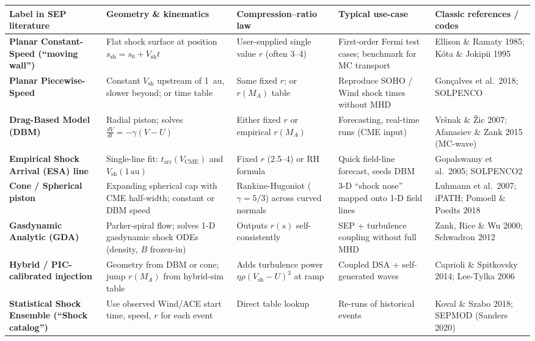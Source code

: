 \begin{longtable}{p{4cm} p{3.5cm} p{3.5cm} p{3.5cm} p{4cm}}
\toprule
\textbf{Label in SEP literature} & \textbf{Geometry \& kinematics} & \textbf{Compression–ratio law} & \textbf{Typical use-case} & \textbf{Classic references / codes} \\
\midrule
\textbf{Planar Constant-Speed (``moving wall'')} & Flat shock surface at position $s_{\mathrm{sh}} = s_0 + V_{\mathrm{sh}} t$ & User-supplied single value $r$ (often 3--4) & First-order Fermi test cases; benchmark for MC transport & Ellison \& Ramaty 1985; Kóta \& Jokipii 1995 \\
\textbf{Planar Piecewise-Speed} & Constant $V_{\mathrm{sh}}$ upstream of 1~au, slower beyond; or time table & Same fixed $r$; or $r(M_A)$ table & Reproduce SOHO / Wind shock times without MHD & Gonçalves et al.\ 2018; SOLPENCO \\
\textbf{Drag-Based Model (DBM)} & Radial piston; solves $\frac{dV}{dt} = -\gamma (V - U)$ & Either fixed $r$ or empirical $r(M_A)$ & Forecasting, real-time runs (CME input) & Vršnak \& Žic 2007; Afanasiev \& Zank 2015 (MC-wave) \\
\textbf{Empirical Shock Arrival (ESA) line} & Single-line fit: $t_{\mathrm{arr}}(V_{\mathrm{CME}})$ and $V_{\mathrm{sh}}(1\,\mathrm{au})$ & Fixed $r$ (2.5--4) or RH formula & Quick field-line forecast, seeds DBM & Gopalswamy et al.\ 2005; SOLPENCO2 \\
\textbf{Cone / Spherical piston} & Expanding spherical cap with CME half-width; constant or DBM speed & Rankine-Hugoniot ($\gamma=5/3$) across curved normals & 3-D ``shock nose'' mapped onto 1-D field lines & Luhmann et al.\ 2007; iPATH; Pomoell \& Poedts 2018 \\
\textbf{Gasdynamic Analytic (GDA)} & Parker-spiral flow; solves 1-D gasdynamic shock ODEs (density, $B$ frozen-in) & Outputs $r(s)$ self-consistently & SEP + turbulence coupling without full MHD & Zank, Rice \& Wu 2000; Schwadron 2012 \\
\textbf{Hybrid / PIC-calibrated injection} & Geometry from DBM or cone; jump $r(M_A)$ from hybrid-sim table & Adds turbulence power $\eta \rho (V_{\mathrm{sh}} - U)^3$ at ramp & Coupled DSA + self-generated waves & Caprioli \& Spitkovsky 2014; Lee-Tylka 2006 \\
\textbf{Statistical Shock Ensemble (``Shock catalog'')} & Use observed Wind/ACE start time, speed, $r$ for each event & Direct table lookup & Re-runs of historical events & Koval \& Szabo 2018; SEPMOD (Sanders 2020) \\
\bottomrule
\end{longtable}

